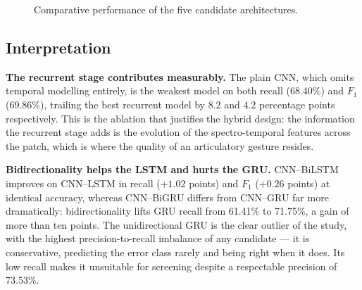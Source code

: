 \begin{figure}[H]
\centering
{}
\caption[Architecture comparison chart]{Comparative performance of the five
candidate architectures.}
\label{fig:arch-comparison}
\end{figure}

\subsection{Interpretation}

\textbf{The recurrent stage contributes measurably.} The plain CNN, which omits
temporal modelling entirely, is the weakest model on both recall (68.40\%) and
$F_1$ (69.86\%), trailing the best recurrent model by 8.2 and 4.2 percentage
points respectively. This is the ablation that justifies the hybrid design: the
information the recurrent stage adds is the evolution of the spectro-temporal
features across the patch, which is where the quality of an articulatory gesture
resides.

\textbf{Bidirectionality helps the LSTM and hurts the GRU.} CNN--BiLSTM improves
on CNN--LSTM in recall ($+1.02$ points) and $F_1$ ($+0.26$ points) at identical
accuracy, whereas CNN--BiGRU differs from CNN--GRU far more dramatically:
bidirectionality lifts GRU recall from 61.41\% to 71.75\%, a gain of more than
ten points. The unidirectional GRU is the clear outlier of the study, with the
highest precision-to-recall imbalance of any candidate --- it is conservative,
predicting the error class rarely and being right when it does. Its low recall
makes it unsuitable for screening despite a respectable precision of 73.53\%.

